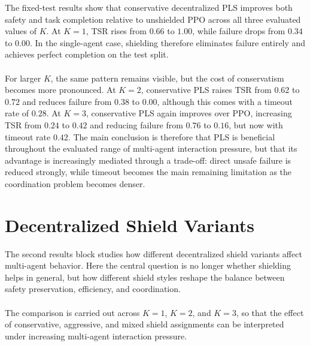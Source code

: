 The fixed-test results show that conservative decentralized PLS improves both safety and task completion relative to unshielded PPO across all three evaluated values of \(K\). At \(K=1\), TSR rises from \(0.66\) to \(1.00\), while failure drops from \(0.34\) to \(0.00\). In the single-agent case, shielding therefore eliminates failure entirely and achieves perfect completion on the test split.
\\
\\
For larger \(K\), the same pattern remains visible, but the cost of conservatism becomes more pronounced. At \(K=2\), conservative PLS raises TSR from \(0.62\) to \(0.72\) and reduces failure from \(0.38\) to \(0.00\), although this comes with a timeout rate of \(0.28\). At \(K=3\), conservative PLS again improves over PPO, increasing TSR from \(0.24\) to \(0.42\) and reducing failure from \(0.76\) to \(0.16\), but now with timeout rate \(0.42\). The main conclusion is therefore that PLS is beneficial throughout the evaluated range of multi-agent interaction pressure, but that its advantage is increasingly mediated through a trade-off: direct unsafe failure is reduced strongly, while timeout becomes the main remaining limitation as the coordination problem becomes denser.

\section{Decentralized Shield Variants}
\label{sec:results-rq2}

The second results block studies how different decentralized shield variants affect multi-agent behavior. Here the central question is no longer whether shielding helps in general, but how different shield styles reshape the balance between safety preservation, efficiency, and coordination.
\\
\\
The comparison is carried out across \(K=1\), \(K=2\), and \(K=3\), so that the effect of conservative, aggressive, and mixed shield assignments can be interpreted under increasing multi-agent interaction pressure.

